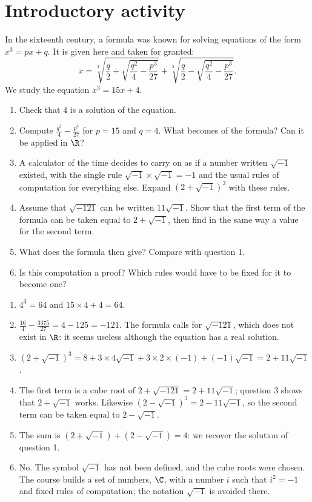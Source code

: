 \mxnewpage
\section{Introductory activity}
\begin{activity}
In the sixteenth century, a formula was known for solving equations of the form $x^3=px+q$. It is given here and taken for granted:
\[x=\sqrt[3]{\frac q2+\sqrt{\frac{q^2}{4}-\frac{p^3}{27}}}+\sqrt[3]{\frac q2-\sqrt{\frac{q^2}{4}-\frac{p^3}{27}}}.\]
We study the equation $x^3=15x+4$.
\begin{enumerate}
\item Check that $4$ is a solution of the equation.
\item Compute $\frac{q^2}{4}-\frac{p^3}{27}$ for $p=15$ and $q=4$. What becomes of the formula? Can it be applied in $\R$?
\item A calculator of the time decides to carry on as if a number written $\sqrt{-1}$ existed, with the single rule $\sqrt{-1}\times\sqrt{-1}=-1$ and the usual rules of computation for everything else. Expand $\left(2+\sqrt{-1}\right)^3$ with these rules.
\item Assume that $\sqrt{-121}$ can be written $11\sqrt{-1}$. Show that the first term of the formula can be taken equal to $2+\sqrt{-1}$, then find in the same way a value for the second term.
\item What does the formula then give? Compare with question 1.
\item Is this computation a proof? Which rules would have to be fixed for it to become one?
\end{enumerate}
\end{activity}
\begin{solution}[Activity]
\begin{enumerate}
\item $4^3=64$ and $15\times4+4=64$.
\item $\frac{16}{4}-\frac{\num{3375}}{27}=4-125=-121$. The formula calls for $\sqrt{-121}$, which does not exist in $\R$: it seems useless although the equation has a real solution.
\item $\left(2+\sqrt{-1}\right)^3=8+3\times4\sqrt{-1}+3\times2\times(-1)+(-1)\sqrt{-1}=2+11\sqrt{-1}$.
\item The first term is a cube root of $2+\sqrt{-121}=2+11\sqrt{-1}$; question 3 shows that $2+\sqrt{-1}$ works. Likewise $\left(2-\sqrt{-1}\right)^3=2-11\sqrt{-1}$, so the second term can be taken equal to $2-\sqrt{-1}$.
\item The sum is $\left(2+\sqrt{-1}\right)+\left(2-\sqrt{-1}\right)=4$: we recover the solution of question 1.
\item No. The symbol $\sqrt{-1}$ has not been defined, and the cube roots were chosen. The course builds a set of numbers, $\C$, with a number $i$ such that $i^2=-1$ and fixed rules of computation; the notation $\sqrt{-1}$ is avoided there.
\end{enumerate}
\end{solution}
